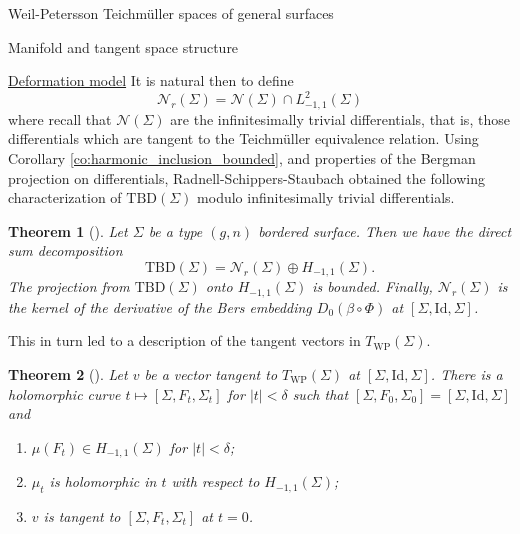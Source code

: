 \documentclass[12pt]{amsart}
\newcommand{\riem}{\Sigma}  %
\theoremstyle{plain}
\newtheorem{theorem}{Theorem}[section]
\theoremstyle{definition}
\theoremstyle{remark}
\numberwithin{equation}{section} %
\numberwithin{figure}{section} %
\begin{document}
\begin{section}{Weil-Petersson Teichm\"uller spaces of general surfaces}
\begin{subsection}{Manifold and tangent space structure}
\begin{subsubsection}{{\underline{Deformation model}}}
  It is natural then to define 
  \[  \mathcal{N}_r(\riem) = \mathcal{N}(\riem) \cap L^2_{-1,1}(\riem) \]
  where recall that $\mathcal{N}(\riem)$ are the infinitesimally trivial differentials, that is, those differentials which are tangent to the Teichm\"uller equivalence relation.
  Using Corollary \ref{co:harmonic_inclusion_bounded}, and properties of the Bergman projection on differentials, Radnell-Schippers-Staubach obtained the following characterization of $\mathrm{TBD}(\riem)$ modulo infinitesimally trivial differentials.  
  \begin{theorem}[\cite{RSS_WP2}] \label{th:modding_out_inf_trivial_us}
   Let $\riem$ be a type $(g,n)$ bordered surface. Then we have the direct sum decomposition 
   \[  \mathrm{TBD}(\riem) = \mathcal{N}_r(\riem) \oplus H_{-1,1}(\riem).   \]
   The projection from $\mathrm{TBD}(\riem)$ onto $H_{-1,1}(\riem)$ is bounded. Finally, 
   $\mathcal{N}_r(\riem)$ is the kernel of the derivative of the Bers embedding $D_0(\beta \circ \Phi)$ at $[\riem,\mathrm{Id},\riem]$.  
  \end{theorem}

  This in turn led to a description of the tangent vectors in $T_{\mathrm{WP}}(\riem)$. 
  \begin{theorem}[\cite{RSS_WP2}]
   Let $v$ be a vector tangent to $T_{\mathrm{WP}}(\riem)$ at $[\riem,\mathrm{Id},\riem]$. There is a holomorphic curve $t \mapsto [\riem,F_t,\riem_t]$ for $|t|<\delta$ such that $[\riem,F_0,\riem_0]=[\riem,\mathrm{Id},\riem]$ and 
   \begin{enumerate}[font=\upshape]
    \item $\mu(F_t) \in H_{-1,1}(\riem)$ for $|t|<\delta$;
    \item $\mu_t$ is holomorphic in $t$ with respect to $H_{-1,1}(\riem)$;
    \item $v$ is tangent to $[\riem,F_t,\riem_t]$ at $t=0$. 
   \end{enumerate}
  \end{theorem}


\end{subsubsection}
\end{subsection}
\end{section}
\end{document}
